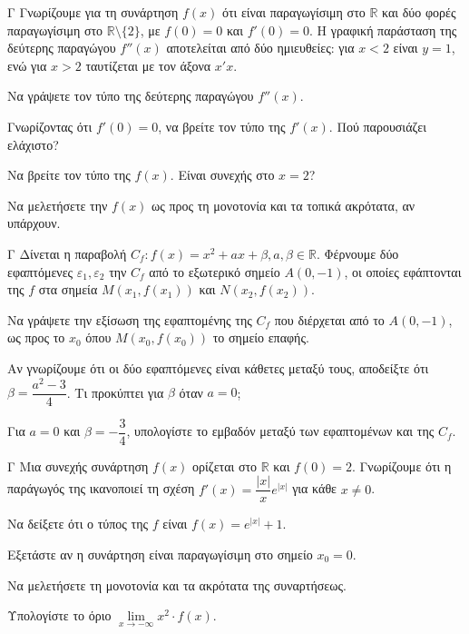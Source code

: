 \begin{thema}{Γ}
Γνωρίζουμε για τη συνάρτηση $f(x)$ ότι είναι παραγωγίσιμη στο $\mathbb{R}$ και δύο φορές παραγωγίσιμη στο $\mathbb{R}\setminus\{2\}$, με $f(0) = 0$ και $f'(0) = 0$. Η γραφική παράσταση της δεύτερης παραγώγου $f''(x)$ αποτελείται από δύο ημιευθείες: για $x<2$ είναι $y = 1$, ενώ για $x>2$ ταυτίζεται με τον άξονα $x'x$.
\begin{erwthma}
  \item Να γράψετε τον τύπο της δεύτερης παραγώγου $f''(x)$.
  \item Γνωρίζοντας ότι $f'(0) = 0$, να βρείτε τον τύπο της $f'(x)$. Πού παρουσιάζει ελάχιστο?
  \item Να βρείτε τον τύπο της $f(x)$. Είναι συνεχής στο $x=2$?
  \item Να μελετήσετε την $f(x)$ ως προς τη μονοτονία και τα τοπικά ακρότατα, αν υπάρχουν.
\end{erwthma}
\end{thema}

\begin{thema}{Γ}
Δίνεται η παραβολή $C_f: f(x) = x^2 + a x + \beta, a, \beta \in \mathbb{R}$. Φέρνουμε δύο εφαπτόμενες $\varepsilon_1,\varepsilon_2$ την $C_f$ από το εξωτερικό σημείο $A(0, -1)$, οι οποίες εφάπτονται της $f$ στα σημεία $M(x_1, f(x_1))$ και $N(x_2, f(x_2))$.
\begin{erwthma}
  \item Να γράψετε την εξίσωση της εφαπτομένης της $C_f$ που διέρχεται από το $A(0,-1)$, ως προς το $x_0$ όπου $M(x_0,f(x_0))$ το σημείο επαφής.
  \item Αν γνωρίζουμε ότι οι δύο εφαπτόμενες είναι κάθετες μεταξύ τους, αποδείξτε ότι $\beta = \dfrac{a^2-3}{4}$. Τι προκύπτει για $\beta$ όταν $a=0$;
  \item Για $a = 0$ και $\beta = -\dfrac{3}{4}$, υπολογίστε το εμβαδόν μεταξύ των εφαπτομένων και της $C_f$.
\end{erwthma}
\end{thema}

\begin{thema}{Γ}
Μια συνεχής συνάρτηση $f(x)$ ορίζεται στο $\mathbb{R}$ και $f(0)=2$. Γνωρίζουμε ότι η παράγωγός της ικανοποιεί τη σχέση $f'(x) = \dfrac{|x|}{x} e^{|x|}$ για κάθε $x \ne 0$.
\begin{erwthma}
  \item Να δείξετε ότι ο τύπος της $f$ είναι $f(x)=e^{|x|}+1$.
  \item Εξετάστε αν η συνάρτηση είναι παραγωγίσιμη στο σημείο $x_0=0$.
  \item Να μελετήσετε τη μονοτονία και τα ακρότατα της συναρτήσεως.
  \item Υπολογίστε το όριο $\lim\limits_{x \to -\infty} x^2 \cdot f(x)$.
\end{erwthma}
\end{thema}

